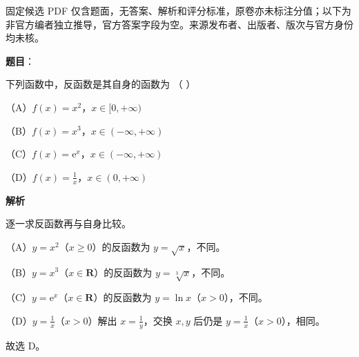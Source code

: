 

\begin{gktip}
固定候选 PDF 仅含题面，无答案、解析和评分标准，原卷亦未标注分值；以下为非官方编者独立推导，官方答案字段为空。来源发布者、出版者、版次与官方身份均未核。
\end{gktip}

\begin{answer}

\textbf{题目}：

下列函数中，反函数是其自身的函数为 （ ）

（A）$f(x)=x^2$，$x\in[0,+\infty)$

（B）$f(x)=x^3$，$x\in(-\infty,+\infty)$

（C）$f(x)=\mathrm{e}^x$，$x\in(-\infty,+\infty)$

（D）$f(x)=\frac1x$，$x\in(0,+\infty)$

\textbf{解析}

逐一求反函数再与自身比较。

（A）$y=x^2$（$x\geqslant0$）的反函数为 $y=\sqrt x$，不同。

（B）$y=x^3$（$x\in\mathbf R$）的反函数为 $y=\sqrt[3]x$，不同。

（C）$y=\mathrm e^x$（$x\in\mathbf R$）的反函数为 $y=\ln x$（$x>0$），不同。

（D）$y=\frac1x$（$x>0$）解出 $x=\frac1y$，交换 $x,y$ 后仍是 $y=\frac1x$（$x>0$），相同。

故选 D。


\end{answer}

